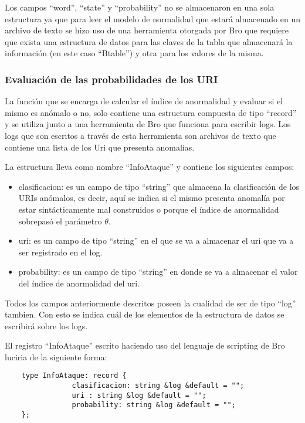 Los campos “word”, “state” y “probability” no se almacenaron en una sola estructura ya que para leer el modelo de normalidad que estará almacenado en un archivo de texto se hizo uso de una herramienta otorgada por Bro que requiere que exista una estructura de datos  para las claves de la tabla que almacenará la información (en este caso “Btable”) y otra para los valores de la misma.

\subsubsection{Evaluación de las probabilidades de los URI}
\label{sssec:estructuraEvaluacion}

La función  que se encarga de calcular el índice de anormalidad  y evaluar si el mismo es anómalo o no, solo contiene una estructura compuesta de tipo “record” y se utiliza junto a una herramienta de Bro que funciona para escribir logs. Los logs que son escritos a través de esta herramienta son archivos de texto que contiene una lista de los Uri que presenta anomalías.

La estructura lleva como nombre “InfoAtaque” y contiene los siguientes campos:

\begin{itemize}
\item clasificacion: es un campo de tipo “string” que almacena la clasificación de los URIs anómalos, es decir, aquí se indica si el mismo presenta anomalía por estar sintácticamente mal construidos o porque el índice de anormalidad sobrepasó el parámetro $\theta$.
\item uri: es un campo de tipo “string” en el que se va a almacenar el uri que va a ser registrado en el log.
\item probability: es un campo de tipo “string” en donde se va a almacenar el valor del índice de anormalidad del uri.
\end{itemize}

Todos los campos anteriormente descritos poseen la cualidad de ser de tipo “log” tambien. Con esto se indica cuál de los elementos de la estructura de datos se escribirá sobre los logs.

    El registro “InfoAtaque” escrito haciendo uso del lenguaje de scripting de Bro luciria de la siguiente forma:

\begin{verbatim}
    type InfoAtaque: record {
                clasificacion: string &log &default = "";
                uri : string &log &default = "";
                probability: string &log &default = "";
    }; 
\end{verbatim}

